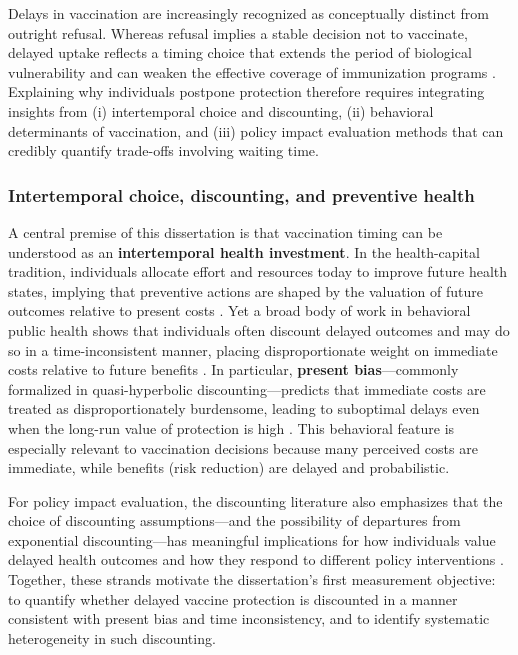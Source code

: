 \documentclass[doublespacing]{utdthesis}
\let\cite=\citep
\begin{document}
Delays in vaccination are increasingly recognized as conceptually distinct from outright refusal. Whereas refusal implies a stable decision not to vaccinate, delayed uptake reflects a timing choice that extends the period of biological vulnerability and can weaken the effective coverage of immunization programs \cite{MacDonald2015_SAGE, Larson2014}. Explaining why individuals postpone protection therefore requires integrating insights from (i) intertemporal choice and discounting, (ii) behavioral determinants of vaccination, and (iii) policy impact evaluation methods that can credibly quantify trade-offs involving waiting time.

\subsubsection{Intertemporal choice, discounting, and preventive health}

A central premise of this dissertation is that vaccination timing can be understood as an \textbf{intertemporal health investment}. In the health-capital tradition, individuals allocate effort and resources today to improve future health states, implying that preventive actions are shaped by the valuation of future outcomes relative to present costs \cite{Grossman1972, Cropper1977}. Yet a broad body of work in behavioral public health shows that individuals often discount delayed outcomes and may do so in a time-inconsistent manner, placing disproportionate weight on immediate costs relative to future benefits \cite{Frederick2002, Attema2018}. In particular, \textbf{present bias}—commonly formalized in quasi-hyperbolic discounting—predicts that immediate costs are treated as disproportionately burdensome, leading to suboptimal delays even when the long-run value of protection is high \cite{Laibson1997, ODonoghueRabin1999}. This behavioral feature is especially relevant to vaccination decisions because many perceived costs are immediate, while benefits (risk reduction) are delayed and probabilistic. 

For policy impact evaluation, the discounting literature also emphasizes that the choice of discounting assumptions—and the possibility of departures from exponential discounting—has meaningful implications for how individuals value delayed health outcomes and how they respond to different policy interventions \cite{Attema2018, Baicker2011}. Together, these strands motivate the dissertation’s first measurement objective: to quantify whether delayed vaccine protection is discounted in a manner consistent with present bias and time inconsistency, and to identify systematic heterogeneity in such discounting.
\end{document}

